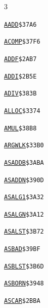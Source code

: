 \begin{multicols}{3}\footnotesize\raggedright
\noindent\hyperlink{l:AADD}{\texttt{AADD}}\hfill\texttt{\$37A6~\phantom{000}\llap{\pageref{l:AADD}}}\par
\noindent\hyperlink{l:ACOMP}{\texttt{ACOMP}}\hfill\texttt{\$37F6~\phantom{000}\llap{\pageref{l:ACOMP}}}\par
\noindent\hyperlink{l:ADDF}{\texttt{ADDF}}\hfill\texttt{\$2AB7~\phantom{000}\llap{\pageref{l:ADDF}}}\par
\noindent\hyperlink{l:ADDI}{\texttt{ADDI}}\hfill\texttt{\$2B5E~\phantom{000}\llap{\pageref{l:ADDI}}}\par
\noindent\hyperlink{l:ADIV}{\texttt{ADIV}}\hfill\texttt{\$383B~\phantom{000}\llap{\pageref{l:ADIV}}}\par
\noindent\hyperlink{l:ALLOC}{\texttt{ALLOC}}\hfill\texttt{\$3374~\phantom{000}\llap{\pageref{l:ALLOC}}}\par
\noindent\hyperlink{l:AMUL}{\texttt{AMUL}}\hfill\texttt{\$38B8~\phantom{000}\llap{\pageref{l:AMUL}}}\par
\noindent\hyperlink{l:ARGWLK}{\texttt{ARGWLK}}\hfill\texttt{\$33B0~\phantom{000}\llap{\pageref{l:ARGWLK}}}\par
\noindent\hyperlink{l:ASADDB}{\texttt{ASADDB}}\hfill\texttt{\$3ABA~\phantom{000}\llap{\pageref{l:ASADDB}}}\par
\noindent\hyperlink{l:ASADDN}{\texttt{ASADDN}}\hfill\texttt{\$390D~\phantom{000}\llap{\pageref{l:ASADDN}}}\par
\noindent\hyperlink{l:ASALG1}{\texttt{ASALG1}}\hfill\texttt{\$3A32~\phantom{000}\llap{\pageref{l:ASALG1}}}\par
\noindent\hyperlink{l:ASALGN}{\texttt{ASALGN}}\hfill\texttt{\$3A12~\phantom{000}\llap{\pageref{l:ASALGN}}}\par
\noindent\hyperlink{l:ASALST}{\texttt{ASALST}}\hfill\texttt{\$3B72~\phantom{000}\llap{\pageref{l:ASALST}}}\par
\noindent\hyperlink{l:ASBAD}{\texttt{ASBAD}}\hfill\texttt{\$39BF~\phantom{000}\llap{\pageref{l:ASBAD}}}\par
\noindent\hyperlink{l:ASBLST}{\texttt{ASBLST}}\hfill\texttt{\$3B6D~\phantom{000}\llap{\pageref{l:ASBLST}}}\par
\noindent\hyperlink{l:ASBORN}{\texttt{ASBORN}}\hfill\texttt{\$3948~\phantom{000}\llap{\pageref{l:ASBORN}}}\par
\noindent\hyperlink{l:ASCAR}{\texttt{ASCAR}}\hfill\texttt{\$2BBA~\phantom{000}\llap{\pageref{l:ASCAR}}}\par

\end{multicols}
